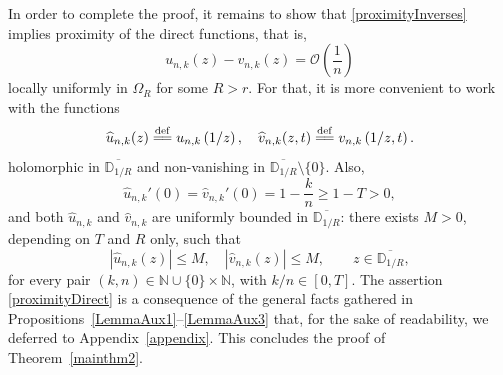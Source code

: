 \documentclass[reqno,11pt]{amsart}
\theoremstyle{plain}
\theoremstyle{definition}
\theoremstyle{remark}
\numberwithin{equation}{section}
\numberwithin{equation}{section}
\newcommand{\N}{\mathbb{N}}
\newcommand{\D}{\mathbb{D}}
\newcommand{\isdef}{\overset{\mathrm{def}}{=\joinrel=}}
\begin{document}
In order to complete the proof, it remains to show that \eqref{proximityInverses} implies proximity of the direct functions, that is, 
\begin{equation}
    \label{proximityDirect}
u_{n, k} (z)-v_{n, k} (z)=\mathcal O\left(\frac{1}{n}\right)
\end{equation}
locally uniformly in $\Omega_R$ for some $R>r$. For that, it is more convenient to work with the functions
$$
\widehat u_{n,k}(z)\isdef u_{n,k}\left(1/z \right), \quad \widehat v_{n,k}(z,t)\isdef v_{n,k}\left(1/z,t\right).
$$
holomorphic in $\overline{\D_{1/R}}$ and non-vanishing in $\overline{\D_{1/R}} \setminus \{0\}$. Also, 
$$
\widehat u_{n, k}' (0)=\widehat v_{n, k}' (0)=1-\frac{k}{n}\ge 1-T>0, 
$$
and both $\widehat u_{n, k}$ and $\widehat v_{n, k}$ are uniformly bounded in $\overline{\D_{1/R}}$: there exists $M>0$, depending on $T$ and $R$ only, such that
$$
\left| \widehat u_{n, k}(z)\right| \leq M, \quad \left| \widehat v_{n, k}(z)\right| \leq M, \qquad z\in \overline{\D_{1/R}} ,
$$
for every pair $(k, n)\in \N\cup \{0\} \times \N$, with $k/n\in [0,T]$. The assertion \eqref{proximityDirect} is a consequence of the general facts gathered in Propositions~\ref{LemmaAux1}--\ref{LemmaAux3} that, for the sake of readability, we deferred to Appendix~\ref{appendix}. This concludes the proof of Theorem~\ref{mainthm2}.
\end{document}
